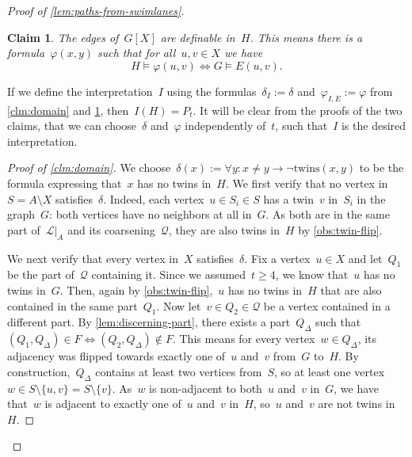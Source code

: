 \documentclass[11pt]{article}      \usepackage[margin=1in]{geometry}  \usepackage{microtype}
\newtheorem{claim}[theorem]{Claim}
\theoremstyle{definition}
\renewcommand{\phi}{\varphi}
\newcommand{\LL}{\mathcal{L}}
\newcommand{\twins}{\mathrm{twins}}
\newcommand{\QQ}{\mathcal{Q}}
\renewcommand{\ge}{\geqslant}
\renewcommand{\geq}{\ge}
\newenvironment{claimproof}[1][\proofname]{\renewcommand{\qedsymbol}{$\blacksquare$}\begin{proof}[#1]}{\end{proof}}
\begin{document}
\begin{proof}[Proof of \cref{lem:paths-from-swimlanes}]
    \begin{claim}\label{clm:edges}
        The edges of~$G[X]$ are definable in~$H$. This means there is a formula~$\phi(x,y)$ such that for all~$u,v \in X$ we have
        \[
            H \models \phi(u,v) \Leftrightarrow G \models E(u,v).  
        \]
    \end{claim}

    If we define the interpretation~$I$ using the formulas~$\delta_I := \delta$ and~$\phi_{I,E} := \phi$ from \cref{clm:domain} and \cref{clm:edges}, then~$I(H) = P_t$.
    It will be clear from the proofs of the two claims, that we can choose~$\delta$ and~$\phi$ independently of~$t$, such that~$I$ is the desired interpretation.
    \begin{claimproof}[Proof of \cref{clm:domain}]
        We choose~$\delta(x) := \forall y: x \neq y \rightarrow \neg \twins(x,y)$ to be the formula expressing that~$x$ has no twins in~$H$.
        We first verify that no vertex in~$S = A \setminus X$ satisfies~$\delta$.
        Indeed, each vertex~$u \in S_i \in S$ has a twin~$v$ in~$S_i$ in the graph~$G$: both vertices have no neighbors at all in~$G$.
        As both are in the same part of~$\LL|_A$ and its coarsening~$\QQ$, they are also twins in~$H$ by \cref{obs:twin-flip}.
        
        We next verify that every vertex in~$X$ satisfies~$\delta$.
        Fix a vertex~$u \in X$ and let~$Q_1$ be the part of~$\QQ$ containing it.
        Since we assumed~$t\geq 4$, we know that~$u$ has no twins in~$G$.
        Then, again by \cref{obs:twin-flip},~$u$ has no twins in~$H$ that are also contained in the same part~$Q_1$.
        Now let~$v \in Q_2 \in \QQ$ be a vertex contained in a different part.
        By \cref{lem:discerning-part}, there exists a part~$Q_\Delta$ such that~$(Q_1,Q_\Delta) \in F \Leftrightarrow  (Q_2,Q_\Delta) \notin F$.
        This means for every vertex~$w \in Q_\Delta$, its adjacency was flipped towards exactly one of~$u$ and~$v$ from~$G$ to~$H$. 
        By construction,~$Q_\Delta$ contains at least two vertices from~$S$, so at least one vertex~$w \in S \setminus \{u,v\} = S \setminus \{v\}$.
        As~$w$ is non-adjacent to both~$u$ and~$v$ in~$G$, we have that~$w$ is adjacent to exactly one of~$u$ and~$v$ in~$H$, so~$u$ and~$v$ are not twins in~$H$.
    \end{claimproof}


\end{proof}
\end{document}
